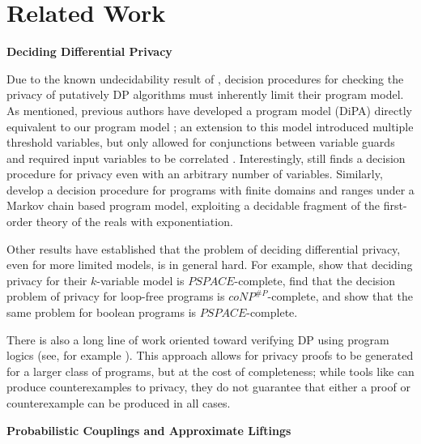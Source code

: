 \section{Related Work}

\textbf{Deciding Differential Privacy}

Due to the known undecidability result of \cite{bartheDecidingDifferentialPrivacy2020}, decision procedures for checking the privacy of putatively DP algorithms must inherently limit their program model. As mentioned, previous authors have developed a program model (DiPA) directly equivalent to our program model \cite{chadhaLinearTimeDecidability2021}; 
an extension to this model introduced multiple threshold variables, but only allowed for conjunctions between variable guards and required input variables to be correlated \cite{chadhaDecidingDifferentialPrivacy2023}. Interestingly, \cite{chadhaDecidingDifferentialPrivacy2023} still finds a decision procedure for privacy even with an arbitrary number of variables. 
Similarly, \cite{bartheDecidingDifferentialPrivacy2020} develop a decision procedure for programs with finite domains and ranges under a Markov chain based program model, exploiting a decidable fragment of the first-order theory of the reals with exponentiation. 

Other results have established that the problem of deciding differential privacy, even for more limited models, is in general hard. For example, \cite{chadhaDecidingDifferentialPrivacy2023} show that deciding privacy for their $k$-variable model is $PSPACE$-complete, \cite{gaboardiComplexityVerifyingLoopFree2020} find that the decision problem of privacy for loop-free programs is $coNP^{\#P}$-complete,
and \cite{bunComplexityVerifyingBoolean2022} show that the same problem for boolean programs is $PSPACE$-complete. 

There is also a long line of work oriented toward verifying DP using program logics (see, for example \cite{reedDistanceMakesTypes2010,wangCheckDPAutomatedIntegrated2020,wangProvingDifferentialPrivacy2019,zhangTestingDifferentialPrivacy2020,zhangLightDPAutomatingDifferential2017}). 
This approach allows for privacy proofs to be generated for a larger class of programs, but at the cost of completeness; while tools like \cite{wangCheckDPAutomatedIntegrated2020} can produce counterexamples to privacy, they do not guarantee that either a proof or counterexample can be produced in all cases.

\textbf{Probabilistic Couplings and Approximate Liftings}


